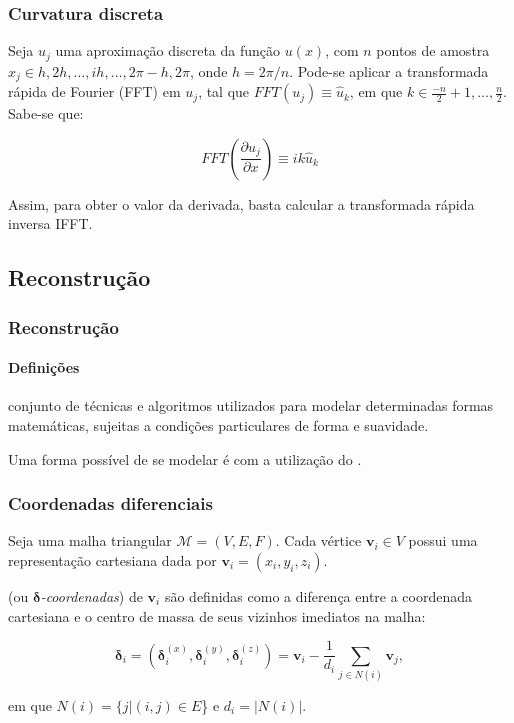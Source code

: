 \begin{frame}
\frametitle{Curvatura discreta}

Seja $u_j$ uma aproximação discreta da função $u(x)$, com $n$ pontos de amostra $x_j \in h, 2h, \dots, ih, \dots, 2\pi - h, 2\pi$, onde $h = 2\pi/n$. Pode-se aplicar a transformada rápida de Fourier (FFT) em $u_j$, tal que $FFT(u_j) \equiv \hat{u}_k$, em que $k \in \frac{-n}{2}+1, \dots, \frac{n}{2}$. Sabe-se que:

\medskip

$$FFT \left (\frac{\partial u_j}{\partial x} \right) \equiv i k \hat{u}_k$$

\medskip

Assim, para obter o valor da derivada, basta calcular a transformada rápida inversa IFFT.
\end{frame}


\subsection{Reconstrução}

\begin{frame}
\frametitle{Reconstrução}
\framesubtitle{Definições}

 conjunto de técnicas e algoritmos utilizados para modelar determinadas formas matemáticas, sujeitas a condições particulares de forma e suavidade.


\medskip
Uma forma possível de se modelar é com a utilização do  \cite{Sorkine2006}.

\end{frame}

\begin{frame}
\frametitle{Coordenadas diferenciais}

Seja uma malha triangular $\mathcal{M} = (V, E, F)$. Cada vértice $\mathbf{v}_i \in V$ possui uma representação cartesiana dada por $\mathbf{v}_i = (x_i,y_i,z_i)$.

\medskip

 (ou $\mathbf{\delta}$\textit{-coordenadas}) de $\mathbf{v}_i$ são definidas como a diferença entre a coordenada cartesiana e o centro de massa de seus vizinhos imediatos na malha:

\begin{equation}
	\mathbf{\delta}_i = (\mathbf{\delta}_i^{(x)}, \mathbf{\delta}_i^{(y)}, \mathbf{\delta}_i^{(z)}) = \mathbf{v}_i - \frac{1}{d_i} \sum_{j \in N(i)} \mathbf{v}_j,
	\label{eq_delta}
\end{equation}

\noindent em que $N(i) = \{j|(i,j) \in E$\} e $d_i = |N(i)|$.

\end{frame}

